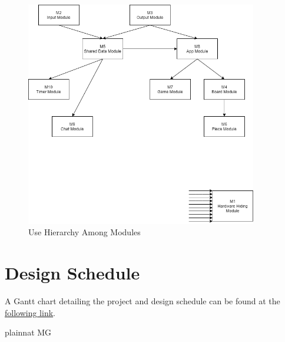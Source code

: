 \documentclass[12pt, titlepage]{article}
\begin{document}
\begin{figure}[H]
\centering
\includegraphics[width=0.9\textwidth]{ModuleHierarchyDiagram.png}
\caption{Use Hierarchy Among Modules}
\label{FigUH}
\end{figure}


\section{Design Schedule}
		
A Gantt chart detailing the project and design schedule can be found at the \href{https://gitlab.cas.mcmaster.ca/celsj/3xa3-group2-chess/-/blob/master/ProjectSchedule/3XA3_ProjectSchedule.pdf}{following link}. 

 {plainnat}
 {MG}
\end{document}
